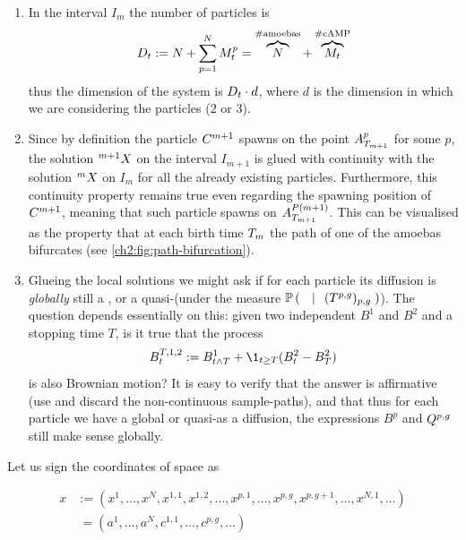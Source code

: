 \begin{remark}
\begin{enumerate}
\item In the interval $I_m$ the number of particles is
\begin{equation}
D_t := N + \sum_{p=1}^N M_t^p = \overbrace{N}^{\# \text{amoebas}} + \overbrace{M_t}^{\# \text{cAMP}}
\end{equation}
thus the dimension of the system is $D_t \cdot d$, where $d$ is the dimension in which we are considering the particles ($2$ or $3$).
\label{ch2:dimension-system}
\item Since by definition the particle $C^{m+1}$ spawns on the point $A_{T_{m+1}}^p$ for some $p$, the solution ${}^{m+1}X$ on the interval $I_{m+1}$ is glued with continuity with the solution ${}^{m}X$ on $I_{m}$ for all the already existing particles.
Furthermore, this continuity property remains true even regarding the spawning position of $C^{m+1}$, meaning that such particle spawns on $A_{T_{m+1}}^{P(m+1)}$.
This can be visualised as the property that at each birth time $T_m$ the path of one of the amoebas bifurcates (see \ref{ch2:fig:path-bifurcation}).
\label{ch2:system-continuous-glueing}
\item Glueing the local solutions we might ask if for each particle its diffusion is \emph{globally} still a \Bm, or a quasi-\Bm (under the measure $\mathbb{P} \left( \; \left. \;  \; \right| \; \;(T^{p,g})_{p,g}  \; \right)$).
The question depends essentially on this: \invquest given two independent \Bm $B^1$ and $B^2$ and a stopping time $T$, is it true that the process
\begin{equation*}
B^{T,1,2}_t := B_{t \wedge T} ^1 + \1_{t\geq T} (B_t^2 - B_T^2)
\end{equation*}
is also Brownian motion?
It is easy to verify that the answer is affirmative (use \eg \autocite[Proposition 2.3]{le-gall} and discard the non-continuous sample-paths), and that thus for each particle we have a global \Bm or quasi-\Bm as a diffusion, \ie the expressions $B^p$ and $Q^{p,g}$ still make sense globally.
\end{enumerate}
\end{remark}



Let us sign the coordinates of space as 

\begin{align*}
x &:= (x^1, \ldots, x^N, x^{1,1}, x^{1,2}, \ldots, x^{p,1},\ldots, x^{p,g},x^{p,g+1},\ldots, x^{N,1}, \ldots)
\\
	&\ = (a^1, \ldots, a^N, c^{1,1}, \ldots, c^{p,g}, \ldots) 
\end{align*}

